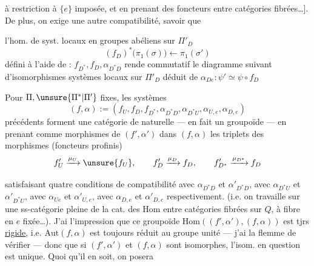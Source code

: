 à restriction à $\{e\}$ imposée, et en prenant des foncteurs
 entre catégories fibrées\ldots].
De plus, on exige une autre compatibilité, savoir que


 l'hom. de syst. locaux en groupes abéliens sur $\Pi'_D$
\[
(f_D)^*\bigl(\pi_1(\sigma)\bigr)
\longleftarrow \pi_1(\sigma')
\]
défini à l'aide de : $f_{D^*},f_D,\alpha_{D^*D}$
rende commutatif le diagramme suivant
d'isomorphismes 
 systèmes locaux sur $\Pi'_D$
déduit de $\alpha_{De}:\psi'\simeq\psi\circ f_D$


Pour $\Pi,\unsure{\Pi^*|\Pi'}$ fixes, les systèmes
\[
(f,\alpha):=(f_U,f_D,f_{D^*},\alpha_{D^*D},\alpha_{D^*U},
\alpha_{U,e},\alpha_{D,e})
\]
précédents forment une catégorie de  naturelle
--- en fait un groupoïde --- en prenant comme morphismes
\inserted{$\mu$} de $(f',\alpha')$ dans $(f,\alpha)$
les triplets des morphismes
(foncteurs profinis)
\[
f'_U\xrightarrow{\mu_U}\unsure{f_U},\qquad
f'_D\xrightarrow{\mu_D}f_D,\qquad
f'_{D^*}\xrightarrow{\mu_{D^*}}f_D
\]


satisfaisant  quatre conditions de compatibilité avec
$\alpha_{D^*D}$ et $\alpha'_{D^*D}$, avec $\alpha_{D^*U}$ et
$\alpha'_{D^*U}$, avec $\alpha_{Ue}$ et $\alpha'_{U,e}$, avec
$\alpha_{D,e}$ et $\alpha'_{D,e}$ respectivement.
(i.e. on travaille sur une ss-catégorie pleine de la
 cat. des \uline{$\mathrm{Hom}$} entre catégories
fibrées sur $Q$, à fibre en $e$ fixée\ldots).
J'ai l'impression que ce groupoïde
\uline{$\mathrm{Hom}$}$((f',\alpha'),(f,\alpha))$ est
tjrs \uline{rigide}, i.e.
$\mathrm{Aut}(f,\alpha)$ est toujours réduit au groupe unité
--- j'ai la flemme de vérifier --- donc que si $(f',\alpha')$ et
$(f,\alpha)$ sont isomorphes, l'isom. en question est unique.
Quoi qu'il en soit, on posera

